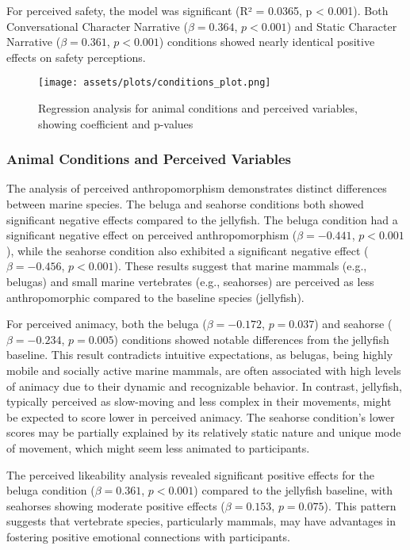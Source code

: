 \documentclass[sigconf, nonacm]{acmart}
\begin{document}
For perceived safety, the model was significant (R² = 0.0365, p < 0.001). Both Conversational Character Narrative ($\beta = 0.364$, $p < 0.001$) and Static Character Narrative ($\beta = 0.361$, $p < 0.001$) conditions showed nearly identical positive effects on safety perceptions.

\begin{figure}
    \centering
    \texttt{[image: assets/plots/conditions\_plot.png]}
    \caption{Regression analysis for animal conditions and perceived variables, showing coefficient and p-values}
    \label{fig:animals}
\end{figure}

\subsubsection{Animal Conditions and Perceived Variables}
The analysis of perceived anthropomorphism demonstrates distinct differences between marine species. The beluga and seahorse conditions both showed significant negative effects compared to the jellyfish. The beluga condition had a significant negative effect on perceived anthropomorphism ($\beta = -0.441$, $p < 0.001$), while the seahorse condition also exhibited a significant negative effect ($\beta = -0.456$, $p < 0.001$). These results suggest that marine mammals (e.g., belugas) and small marine vertebrates (e.g., seahorses) are perceived as less anthropomorphic compared to the baseline species (jellyfish).

For perceived animacy, both the beluga ($\beta = -0.172$, $p = 0.037$) and seahorse ($\beta = -0.234$, $p = 0.005$) conditions showed notable differences from the jellyfish baseline. This result contradicts intuitive expectations, as belugas, being highly mobile and socially active marine mammals, are often associated with high levels of animacy due to their dynamic and recognizable behavior. In contrast, jellyfish, typically perceived as slow-moving and less complex in their movements, might be expected to score lower in perceived animacy. The seahorse condition’s lower scores may be partially explained by its relatively static nature and unique mode of movement, which might seem less animated to participants.

The perceived likeability analysis revealed significant positive effects for the beluga condition ($\beta = 0.361$, $p < 0.001$) compared to the jellyfish baseline, with seahorses showing moderate positive effects ($\beta = 0.153$, $p = 0.075$). This pattern suggests that vertebrate species, particularly mammals, may have advantages in fostering positive emotional connections with participants.
\end{document}
